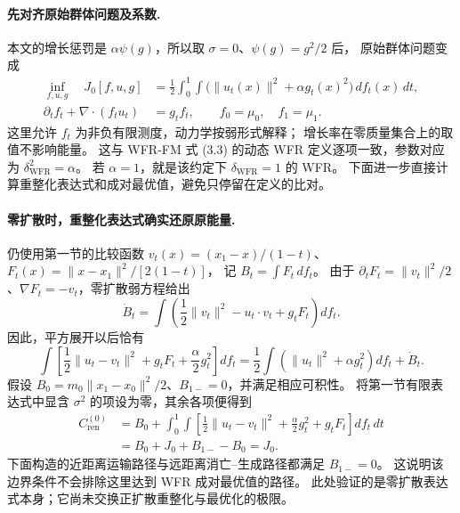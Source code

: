 \documentclass[UTF8,a4paper,11pt,fontset=fandol]{ctexart}
\begin{document}
\paragraph{先对齐原始群体问题及系数.}
本文的增长惩罚是 $\alpha\psi(g)$，所以取 $\sigma=0$、$\psi(g)=g^2/2$ 后，
原始群体问题变成
\begin{equation}
\begin{aligned}
\inf_{f,u,g}\quad
J_0[f,u,g]&=\frac12\int_0^1\int
\bigl(\|u_t(x)\|^2+\alpha g_t(x)^2\bigr)\,df_t(x)\,dt,\\
\partial_tf_t+\nabla\cdot(f_tu_t)&=g_tf_t,\qquad
f_0=\mu_0,\quad f_1=\mu_1.
\end{aligned}
\label{eq:zero-noise-wfr-dynamic}
\end{equation}
这里允许 $f_t$ 为非负有限测度，动力学按弱形式解释；
增长率在零质量集合上的取值不影响能量。
这与 WFR-FM 式 (3.3) 的动态 WFR 定义逐项一致，参数对应为
$\delta_{\mathrm{WFR}}^2=\alpha$。
若 $\alpha=1$，就是该约定下 $\delta_{\mathrm{WFR}}=1$ 的 WFR。
下面进一步直接计算重整化表达式和成对最优值，避免只停留在定义的比对。

\paragraph{零扩散时，重整化表达式确实还原原能量.}
仍使用第一节的比较函数
$v_t(x)=(x_1-x)/(1-t)$、$F_t(x)=\|x-x_1\|^2/[2(1-t)]$，
记 $B_t=\int F_t\,df_t$。
由于 $\partial_tF_t=\|v_t\|^2/2$、$\nabla F_t=-v_t$，零扩散弱方程给出
\begin{equation}
\dot B_t=\int
\left(\frac12\|v_t\|^2-u_t\cdot v_t+g_tF_t\right)df_t.
\end{equation}
因此，平方展开以后恰有
\begin{equation}
\int\left[\frac12\|u_t-v_t\|^2+g_tF_t
+\frac\alpha2g_t^2\right]df_t
=\frac12\int(\|u_t\|^2+\alpha g_t^2)df_t+\dot B_t.
\end{equation}
假设 $B_0=m_0\|x_1-x_0\|^2/2$、$B_{1-}=0$，并满足相应可积性。
将第一节有限表达式中显含 $\sigma^2$ 的项设为零，其余各项便得到
\begin{equation}
\begin{aligned}
C_{\mathrm{ren}}^{(0)}
&=B_0+\int_0^1\int
\left[\frac12\|u_t-v_t\|^2+\frac\alpha2g_t^2+g_tF_t\right]df_t\,dt\\
&=B_0+J_0+B_{1-}-B_0
=J_0.
\end{aligned}
\label{eq:zero-noise-ren-action}
\end{equation}
下面构造的近距离运输路径与远距离消亡--生成路径都满足 $B_{1-}=0$。
这说明该边界条件不会排除这里达到 WFR 成对最优值的路径。
此处验证的是零扩散表达式本身；它尚未交换正扩散重整化与最优化的极限。
\end{document}
